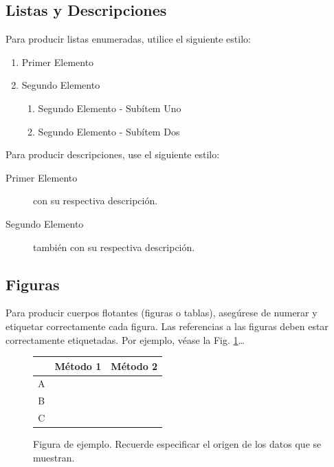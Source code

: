 \documentclass[a4paper,10pt,twocolumn]{article}
\begin{document}



	\subsection{Listas y Descripciones}\label{sub:lists}
		Para producir listas enumeradas, utilice el siguiente estilo:
		\begin{enumerate}
			\item Primer Elemento
			\item Segundo Elemento
			\begin {enumerate}
				\item {Segundo Elemento - Subítem Uno}
				\item {Segundo Elemento - Subítem Dos}
			\end {enumerate}
		\end{enumerate}

		Para producir descripciones, use el siguiente estilo:

		\begin{description}
			\item [Primer Elemento] con su respectiva descripción.
			\item [Segundo Elemento] también con su respectiva descripción.
		\end{description}

	\subsection{Figuras}\label{sub:figures}
		Para producir cuerpos flotantes (figuras o tablas), asegúrese de numerar
		y etiquetar correctamente cada figura. Las referencias a las figuras deben
		estar correctamente etiquetadas. Por ejemplo, véase la Fig. \ref{fig:ex}\ldots

		\begin{figure}[h!]%
		\begin{center}
			\begin{tabular}{|c|c|c|} \hline
			 			& Método 1 	& Método 2 	\\ \hline
			A 			&  			&  			\\ \hline
			B			& 			& 			\\ \hline
			C 			& 			&  			\\ \hline
			\end{tabular}
		\caption{Figura de ejemplo. Recuerde especificar el origen de los datos que se muestran. \label{fig:ex}}
		\end{center}
		\end{figure}
\end{document}
